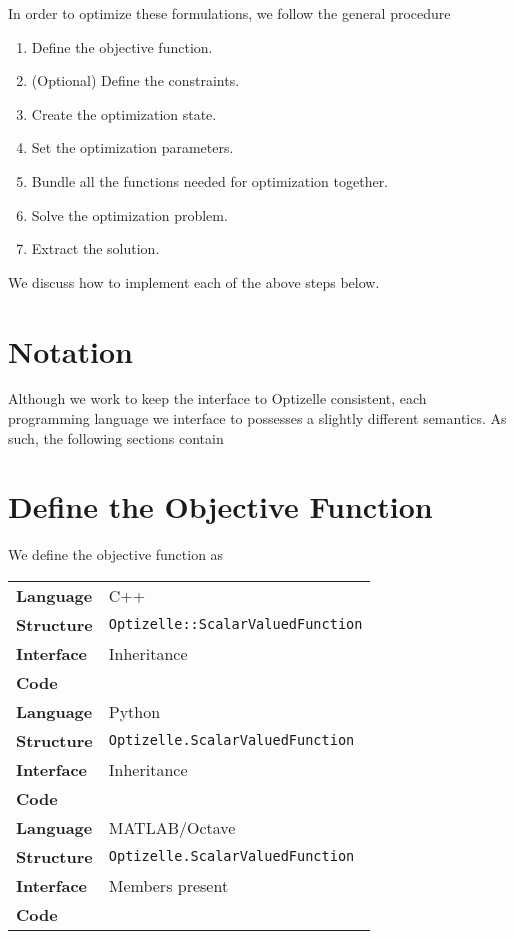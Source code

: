 \documentclass{report}
\makeatletter
\newcommand{\textct}{\begingroup\@activeus\@textct}
\newcommand*{\@textct}[1]{\texttt{#1}\endgroup}
\makeatother
\begin{document}
        In order to optimize these formulations, we follow the general procedure
\begin{enumerate}
    \item Define the objective function.
    \item (Optional) Define the constraints.
    \item Create the optimization state. 
    \item Set the optimization parameters.
    \item Bundle all the functions needed for optimization together. 
    \item Solve the optimization problem. 
    \item Extract the solution.
\end{enumerate}
We discuss how to implement each of the above steps below. 

\section{Notation}

        Although we work to keep the interface to Optizelle consistent, each programming language we interface to possesses a slightly different semantics.  As such, the following sections contain
        

\section{Define the Objective Function}

        We define the objective function as
\begin{center}\begin{longtable}{|ll|}\hline
    \textbf{Language} & C++\\
    \textbf{Structure} & \textct{Optizelle::ScalarValuedFunction}\\
    \textbf{Interface} & Inheritance\\
    \textbf{Code} & \\\hline
    \textbf{Language} & Python\\
    \textbf{Structure} & \textct{Optizelle.ScalarValuedFunction}\\
    \textbf{Interface} & Inheritance\\
    \textbf{Code} & \\\hline
    \textbf{Language} & MATLAB/Octave\\
    \textbf{Structure} & \textct{Optizelle.ScalarValuedFunction}\\
    \textbf{Interface} & Members present\\
    \textbf{Code} & \\\hline
\end{longtable}\end{center}
\end{document}
